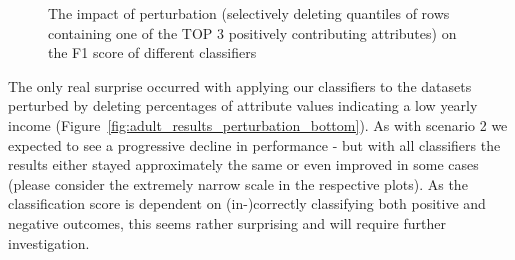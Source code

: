 \documentclass{llncs}
\begin{document}
\begin{figure}[!t]
\begin{center}
		\caption{The impact of perturbation (selectively deleting quantiles of rows containing one of the TOP 3 positively contributing attributes) on the F1 score of different classifiers}
		\label{fig:adult_results_perturbation_top}
	\end{center}
\end{figure}


The only real surprise occurred with applying our classifiers to the datasets perturbed by deleting percentages of attribute values indicating a low yearly income (Figure~\ref{fig:adult_results_perturbation_bottom}). As with scenario 2 we expected to see a progressive decline in performance - but with all classifiers the results either stayed approximately the same or even improved in some cases (please consider the extremely narrow scale in the respective plots). As the classification score is dependent on (in-)correctly classifying both positive and negative outcomes, this seems rather surprising and will require further investigation.
\end{document}
